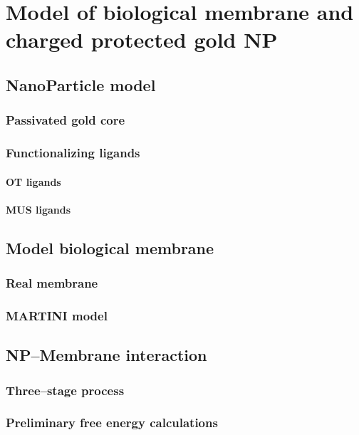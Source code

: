 \chapter{Model of biological membrane and charged protected gold NP}

\section{NanoParticle model}

\subsection{Passivated gold core}

\subsection{Functionalizing ligands}


\subsubsection{OT ligands}

\subsubsection{MUS ligands} %

\section{Model biological membrane}

\subsection{Real membrane}

\subsection{MARTINI model}

\section{NP--Membrane interaction}

\subsection{Three--stage process}

\subsection{Preliminary free energy calculations}